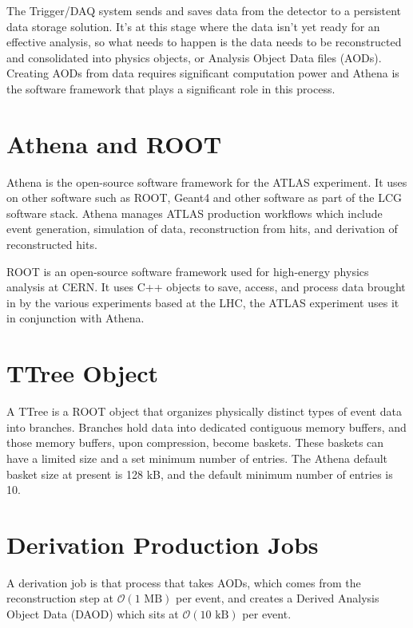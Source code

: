 The Trigger/DAQ system sends and saves data from the detector to a persistent data storage solution.
It's at this stage where the data isn't yet ready for an effective analysis, so what needs to happen is the data needs to be reconstructed and consolidated into physics objects, or Analysis Object Data files (AODs).
Creating AODs from data requires significant computation power and Athena is the software framework that plays a significant role in this process.

\section{Athena and ROOT}
Athena is the open-source software framework for the ATLAS experiment.\cite{athena}
It uses on other software such as ROOT, Geant4 and other software as part of the LCG software stack. 
Athena manages ATLAS production workflows which include event generation, simulation of data, reconstruction from hits, and derivation of reconstructed hits.\cite{athenadocs}

ROOT is an open-source software framework used for high-energy physics analysis at CERN.\cite{ROOT_about} 
It uses C++ objects to save, access, and process data brought in by the various experiments based at the LHC, the ATLAS experiment uses it in conjunction with Athena.


\section{TTree Object}
A TTree is a ROOT object that organizes physically distinct types of event data into branches.
Branches hold data into dedicated contiguous memory buffers, and those memory buffers, upon compression, become baskets.
These baskets can have a limited size and a set minimum number of entries. 
The Athena default basket size at present is 128 kB, and the default minimum number of entries is 10. 
 

\section{Derivation Production Jobs}
A derivation job is that process that takes AODs, which comes from the reconstruction step at $\mathcal{O}(1 \text{ MB})$ per event, and creates a Derived Analysis Object Data (DAOD) which sits at $\mathcal{O}(10 \text{ kB})$ per event.


